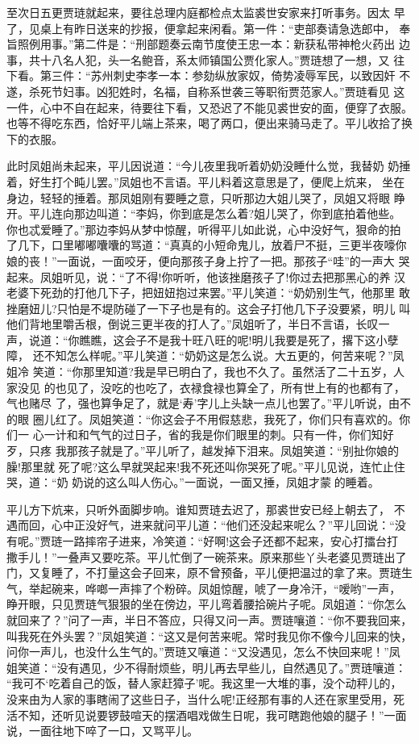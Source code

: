 至次日五更贾琏就起来，要往总理内庭都检点太监裘世安家来打听事务。因太
早了，见桌上有昨日送来的抄报，便拿起来闲看。第一件：“吏部奏请急选郎中，
奉旨照例用事。”第二件是：“刑部题奏云南节度使王忠一本：新获私带神枪火药出
边事，共十八名人犯，头一名鲍音，系太师镇国公贾化家人。”贾琏想了一想，又
往下看。第三件：“苏州刺史李孝一本：参劾纵放家奴，倚势凌辱军民，以致因奸
不遂，杀死节妇事。凶犯姓时，名福，自称系世袭三等职衔贾范家人。”贾琏看见
这一件，心中不自在起来，待要往下看，又恐迟了不能见裘世安的面，便穿了衣服。
也等不得吃东西，恰好平儿端上茶来，喝了两口，便出来骑马走了。平儿收拾了换
下的衣服。

此时凤姐尚未起来，平儿因说道：“今儿夜里我听着奶奶没睡什么觉，我替奶
奶捶着，好生打个盹儿罢。”凤姐也不言语。平儿料着这意思是了，便爬上炕来，
坐在身边，轻轻的捶着。那凤姐刚有要睡之意，只听那边大姐儿哭了，凤姐又将眼
睁开。平儿连向那边叫道：“李妈，你到底是怎么着?姐儿哭了，你到底拍着他些。
你也忒爱睡了。”那边李妈从梦中惊醒，听得平儿如此说，心中没好气，狠命的拍
了几下，口里嘟嘟囔囔的骂道：“真真的小短命鬼儿，放着尸不挺，三更半夜嚎你
娘的丧！”一面说，一面咬牙，便向那孩子身上拧了一把。那孩子“哇”的一声大
哭起来。凤姐听见，说：“了不得!你听听，他该挫磨孩子了!你过去把那黑心的养
汉老婆下死劲的打他几下子，把妞妞抱过来罢。”平儿笑道：“奶奶别生气，他那里
敢挫磨妞儿?只怕是不堤防碰了一下子也是有的。这会子打他几下子没要紧，明儿
叫他们背地里嚼舌根，倒说三更半夜的打人了。”凤姐听了，半日不言语，长叹一
声，说道：“你瞧瞧，这会子不是我十旺八旺的呢!明儿我要是死了，撂下这小孽障，
还不知怎么样呢。”平儿笑道：“奶奶这是怎么说。大五更的，何苦来呢？”凤姐冷
笑道：“你那里知道?我是早已明白了，我也不久了。虽然活了二十五岁，人家没见
的也见了，没吃的也吃了，衣禄食禄也算全了，所有世上有的也都有了，气也赌尽
了，强也算争足了，就是‘寿’字儿上头缺一点儿也罢了。”平儿听说，由不的眼
圈儿红了。凤姐笑道：“你这会子不用假慈悲，我死了，你们只有喜欢的。你们一
心一计和和气气的过日子，省的我是你们眼里的刺。只有一件，你们知好歹，只疼
我那孩子就是了。”平儿听了，越发掉下泪来。凤姐笑道：“别扯你娘的臊!那里就
死了呢?这么早就哭起来!我不死还叫你哭死了呢。”平儿见说，连忙止住哭，道：“奶
奶说的这么叫人伤心。”一面说，一面又捶，凤姐才蒙的睡着。

平儿方下炕来，只听外面脚步响。谁知贾琏去迟了，那裘世安已经上朝去了，
不遇而回，心中正没好气，进来就问平儿道：“他们还没起来呢么？”平儿回说：“没
有呢。”贾琏一路摔帘子进来，冷笑道：“好啊!这会子还都不起来，安心打擂台打
撒手儿！”一叠声又要吃茶。平儿忙倒了一碗茶来。原来那些丫头老婆见贾琏出了
门，又复睡了，不打量这会子回来，原不曾预备，平儿便把温过的拿了来。贾琏生
气，举起碗来，哗啷一声摔了个粉碎。凤姐惊醒，唬了一身冷汗，“嗳哟”一声，
睁开眼，只见贾琏气狠狠的坐在傍边，平儿弯着腰拾碗片子呢。凤姐道：“你怎么
就回来了？”问了一声，半日不答应，只得又问一声。贾琏嚷道：“你不要我回来，
叫我死在外头罢？”凤姐笑道：“这又是何苦来呢。常时我见你不像今儿回来的快，
问你一声儿，也没什么生气的。”贾琏又嚷道：“又没遇见，怎么不快回来呢！”凤
姐笑道：“没有遇见，少不得耐烦些，明儿再去早些儿，自然遇见了。”贾琏嚷道：
“我可不‘吃着自己的饭，替人家赶獐子’呢。我这里一大堆的事，没个动秤儿的，
没来由为人家的事瞎闹了这些日子，当什么呢!正经那有事的人还在家里受用，死
活不知，还听见说要锣鼓喧天的摆酒唱戏做生日呢，我可瞎跑他娘的腿子！”一面
说，一面往地下啐了一口，又骂平儿。

